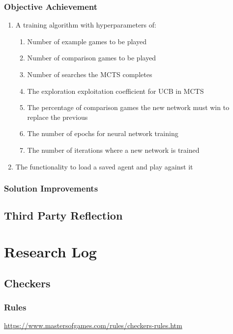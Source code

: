 \documentclass{article}
\begin{document}
    \subsubsection{Objective Achievement}
    \begin{enumerate}
        \item A training algorithm with hyperparameters of:
        \begin{enumerate}
            \item Number of example games to be played
            \item Number of comparison games to be played
            \item Number of searches the MCTS completes
            \item The exploration exploitation coefficient for UCB in MCTS
            \item The percentage of comparison games the new network must win to replace the previous
            \item The number of epochs for neural network training
            \item The number of iterations where a new network is trained
        \end{enumerate}
        \item The functionality to load a saved agent and play against it
    \end{enumerate}

    \subsubsection{Solution Improvements}



    \subsection{Third Party Reflection}



    \section{Research Log}

    \subsection{Checkers}
    \subsubsection{Rules}
    \noindent \url{https://www.mastersofgames.com/rules/checkers-rules.htm}
\end{document}
